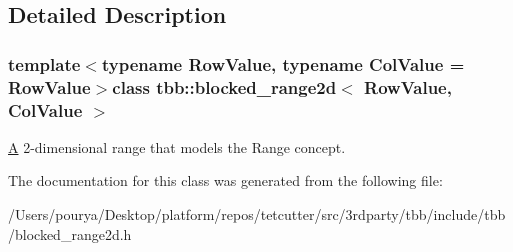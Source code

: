 \subsection{Detailed Description}
\subsubsection*{template$<$typename Row\+Value, typename Col\+Value = Row\+Value$>$class tbb\+::blocked\+\_\+range2d$<$ Row\+Value, Col\+Value $>$}

\hyperlink{structA}{A} 2-\/dimensional range that models the Range concept. 



The documentation for this class was generated from the following file\+:\begin{DoxyCompactItemize}
\item 
/\+Users/pourya/\+Desktop/platform/repos/tetcutter/src/3rdparty/tbb/include/tbb/blocked\+\_\+range2d.\+h\end{DoxyCompactItemize}
